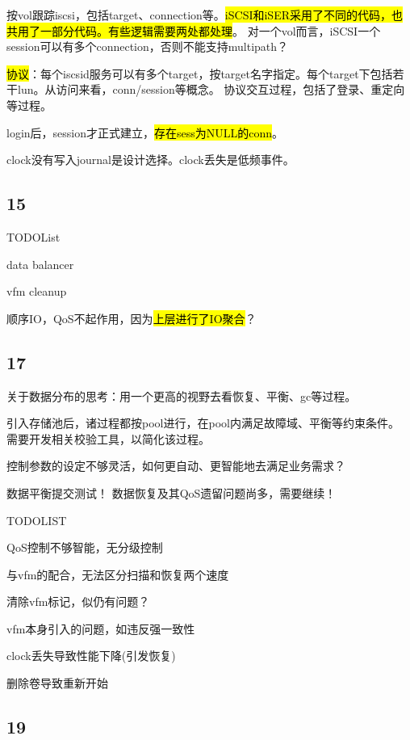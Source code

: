 按vol跟踪iscsi，包括target、connection等。\hl{iSCSI和iSER采用了不同的代码，也共用了一部分代码。有些逻辑需要两处都处理}。
对一个vol而言，iSCSI一个session可以有多个connection，否则不能支持multipath？

\hl{协议}：每个iscsid服务可以有多个target，按target名字指定。每个target下包括若干lun。从访问来看，conn/session等概念。
协议交互过程，包括了登录、重定向等过程。

login后，session才正式建立，\hl{存在sess为NULL的conn}。

clock没有写入journal是设计选择。clock丢失是低频事件。

\subsection{15}

TODOList
\begin{enumbox}
\item data balancer
\item vfm cleanup
\end{enumbox}

顺序IO，QoS不起作用，因为\hl{上层进行了IO聚合}？

\subsection{17}

关于数据分布的思考：用一个更高的视野去看恢复、平衡、gc等过程。

引入存储池后，诸过程都按pool进行，在pool内满足故障域、平衡等约束条件。
需要开发相关校验工具，以简化该过程。

控制参数的设定不够灵活，如何更自动、更智能地去满足业务需求？

数据平衡提交测试！ 数据恢复及其QoS遗留问题尚多，需要继续！

TODOLIST
\begin{enumbox}
\item QoS控制不够智能，无分级控制
\item 与vfm的配合，无法区分扫描和恢复两个速度
\item 清除vfm标记，似仍有问题？
\item vfm本身引入的问题，如违反强一致性
\item clock丢失导致性能下降(引发恢复)
\item 删除卷导致重新开始
\end{enumbox}

\subsection{19}


